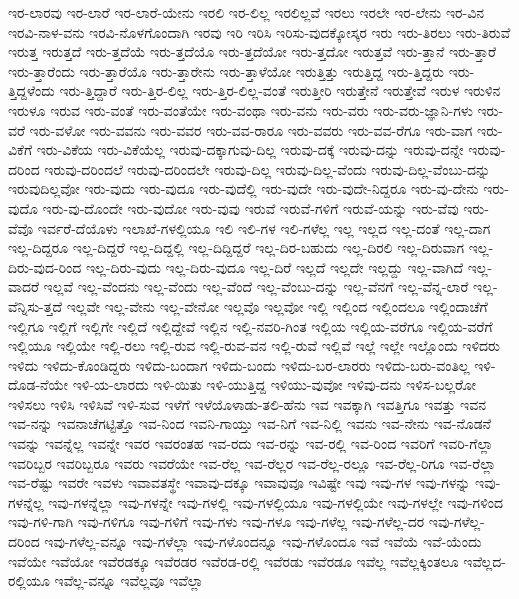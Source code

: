 {ಇರ-ಲಾರವು
ಇರ-ಲಾರೆ
ಇರ-ಲಾರೆ-ಯೇನು
ಇರಲಿ
ಇರ-ಲಿಲ್ಲ
ಇರಲಿಲ್ಲವೆ
ಇರಲು
ಇರಲೇ
ಇರ-ಲೇನು
ಇರ-ವಿನ
ಇರವಿ-ನಾಳ-ವನು
ಇರವಿ-ನೊಳಗೊಂದಾಗಿ
ಇರವು
ಇರಿ
ಇರಿಸಿ
ಇರಿಸು-ವುದಕ್ಕೋಸ್ಕರ
ಇರು
ಇರು-ತಿರಲು
ಇರು-ತಿರುವೆ
ಇರುತ್ತ
ಇರುತ್ತದೆ
ಇರು-ತ್ತದೆಯೆ
ಇರು-ತ್ತದೆಯೊ
ಇರು-ತ್ತದೆಯೋ
ಇರು-ತ್ತದೋ
ಇರುತ್ತವೆ
ಇರು-ತ್ತಾನೆ
ಇರು-ತ್ತಾರೆ
ಇರು-ತ್ತಾರೆಂದು
ಇರು-ತ್ತಾರೆಯೊ
ಇರು-ತ್ತಾರೇನು
ಇರು-ತ್ತಾಳೆಯೋ
ಇರುತ್ತಿತ್ತು
ಇರುತ್ತಿದ್ದ
ಇರು-ತ್ತಿದ್ದರು
ಇರು-ತ್ತಿದ್ದಳೆಂದು
ಇರು-ತ್ತಿದ್ದಾರೆ
ಇರು-ತ್ತಿರ-ಲಿಲ್ಲ
ಇರು-ತ್ತಿರ-ಲಿಲ್ಲ-ವಂತೆ
ಇರುತ್ತೀರಿ
ಇರುತ್ತೇನೆ
ಇರುತ್ತೇವೆ
ಇರುಳ
ಇರುಳಿನ
ಇರುಳೂ
ಇರುವ
ಇರು-ವಂತೆ
ಇರು-ವಂತೆಯೇ
ಇರು-ವಂಥಾ
ಇರು-ವನು
ಇರು-ವರು
ಇರು-ವರು-ಜ್ಞಾನಿ-ಗಳು
ಇರು-ವರೆ
ಇರು-ವಳೋ
ಇರು-ವವನು
ಇರು-ವವರ
ಇರು-ವವ-ರಾರೂ
ಇರು-ವವರು
ಇರು-ವವ-ರೆಗೂ
ಇರು-ವಾಗ
ಇರು-ವಿಕೆಗೆ
ಇರು-ವಿಕೆಯ
ಇರು-ವಿಕೆಯೆಲ್ಲ
ಇರುವು-ದಕ್ಕಾಗುವು-ದಿಲ್ಲ
ಇರುವು-ದಕ್ಕೆ
ಇರುವು-ದನ್ನು
ಇರುವು-ದನ್ನೇ
ಇರುವು-ದರಿಂದ
ಇರುವು-ದರಿಂದಲೆ
ಇರುವು-ದರಿಂದಲೇ
ಇರುವು-ದಿಲ್ಲ
ಇರುವು-ದಿಲ್ಲ-ವೆಂದು
ಇರುವು-ದಿಲ್ಲ-ವೆಂಬು-ದನ್ನು
ಇರುವುದಿಲ್ಲವೋ
ಇರು-ವುದು
ಇರು-ವುದೂ
ಇರು-ವುದೆಲ್ಲಿ
ಇರು-ವುದೇ
ಇರು-ವುದೇ-ನಿದ್ದರೂ
ಇರು-ವು-ದೇನು
ಇರು-ವುದೊ
ಇರು-ವು-ದೊಂದೇ
ಇರು-ವುದೋ
ಇರು-ವುವು
ಇರುವೆ
ಇರುವೆ-ಗಳಿಗೆ
ಇರುವೆ-ಯನ್ನು
ಇರು-ವೆವು
ಇರು-ವೆವೊ
ಇರ್ವರೆ-ದೆಯೊಳು
ಇಲಾಖೆ-ಗಳಲ್ಲಿಯೂ
ಇಲಿ
ಇಲಿ-ಗಳ
ಇಲಿ-ಗಳೆಲ್ಲ
ಇಲ್ಲ
ಇಲ್ಲದ
ಇಲ್ಲ-ದಂತೆ
ಇಲ್ಲ-ದಾಗ
ಇಲ್ಲ-ದಿದ್ದರೂ
ಇಲ್ಲ-ದಿದ್ದರೆ
ಇಲ್ಲ-ದಿದ್ದಲ್ಲಿ
ಇಲ್ಲ-ದಿದ್ದಿದ್ದರೆ
ಇಲ್ಲ-ದಿರ-ಬಹುದು
ಇಲ್ಲ-ದಿರಲಿ
ಇಲ್ಲ-ದಿರುವಾಗ
ಇಲ್ಲ-ದಿರು-ವುದ-ರಿಂದ
ಇಲ್ಲ-ದಿರು-ವುದು
ಇಲ್ಲ-ದಿರು-ವುದೂ
ಇಲ್ಲ-ದಿರೆ
ಇಲ್ಲದೆ
ಇಲ್ಲದೇ
ಇಲ್ಲದ್ದು
ಇಲ್ಲ-ವಾಗಿದೆ
ಇಲ್ಲ-ವಾದರೆ
ಇಲ್ಲವೆ
ಇಲ್ಲ-ವೆಂದನು
ಇಲ್ಲ-ವೆಂದು
ಇಲ್ಲ-ವೆಂದೆ
ಇಲ್ಲ-ವೆಂಬು-ದನ್ನು
ಇಲ್ಲ-ವೆನಗೆ
ಇಲ್ಲ-ವೆನ್ನ-ಲಾರೆ
ಇಲ್ಲ-ವೆನ್ನಿಸು-ತ್ತದೆ
ಇಲ್ಲವೇ
ಇಲ್ಲ-ವೇನು
ಇಲ್ಲ-ವೇನೋ
ಇಲ್ಲವೊ
ಇಲ್ಲವೋ
ಇಲ್ಲಿ
ಇಲ್ಲಿಂದ
ಇಲ್ಲಿಂದಲೂ
ಇಲ್ಲಿಂದಾಚೆಗೆ
ಇಲ್ಲಿಗೂ
ಇಲ್ಲಿಗೆ
ಇಲ್ಲಿಗೇ
ಇಲ್ಲಿದೆ
ಇಲ್ಲಿದ್ದೇವೆ
ಇಲ್ಲಿನ
ಇಲ್ಲಿ-ನವರಿ-ಗಿಂತ
ಇಲ್ಲಿಯ
ಇಲ್ಲಿಯ-ವರೆಗೂ
ಇಲ್ಲಿಯ-ವರೆಗೆ
ಇಲ್ಲಿಯೂ
ಇಲ್ಲಿಯೇ
ಇಲ್ಲಿ-ರಲು
ಇಲ್ಲಿ-ರುವ
ಇಲ್ಲಿ-ರುವ-ವನ
ಇಲ್ಲಿ-ರುವೆ
ಇಲ್ಲಿವೆ
ಇಲ್ಲೆ
ಇಲ್ಲೇ
ಇಲ್ಲೊಂದು
ಇಳಿದರು
ಇಳಿದು
ಇಳಿದು-ಕೊಂಡಿದ್ದರು
ಇಳಿದು-ಬಂದಾಗ
ಇಳಿದು-ಬಂದು
ಇಳಿದು-ಬರ-ಲಾರರು
ಇಳಿದು-ಬರು-ವಂತಿಲ್ಲ
ಇಳಿ-ದೊಡ-ನೆಯೇ
ಇಳಿ-ಯ-ಲಾರದು
ಇಳಿ-ಯಿತು
ಇಳಿ-ಯುತ್ತಿದ್ದ
ಇಳಿಯು-ವುವೋ
ಇಳಿವು-ದನು
ಇಳಿಸ-ಬಲ್ಲರೋ
ಇಳಿಸಲು
ಇಳಿಸಿ
ಇಳಿಸಿವೆ
ಇಳಿ-ಸುವ
ಇಳೆಗೆ
ಇಳೆಯೊಳಾಡು-ತಲಿ-ಹೆನು
ಇವ
ಇವಕ್ಕಾಗಿ
ಇವತ್ತಿಗೂ
ಇವತ್ತು
ಇವನ
ಇವ-ನನ್ನು
ಇವನಾಚೆಗಟ್ಟಿತ್ತೊ
ಇವ-ನಿಂದ
ಇವನಿ-ಗಾಯ್ತು
ಇವ-ನಿಗೆ
ಇವ-ನಿಲ್ಲಿ
ಇವನು
ಇವ-ನೇನು
ಇವ-ನೊಡನೆ
ಇವನ್ನು
ಇವನ್ನೆಲ್ಲ
ಇವನ್ನೇ
ಇವರ
ಇವರಂತಹ
ಇವ-ರದು
ಇವ-ರನ್ನು
ಇವ-ರಲ್ಲಿ
ಇವ-ರಿಂದ
ಇವರಿಗೆ
ಇವರಿ-ಗೆಲ್ಲಾ
ಇವರಿಬ್ಬರ
ಇವರಿಬ್ಬರೂ
ಇವರು
ಇವರೆಯೇ
ಇವ-ರೆಲ್ಲ
ಇವ-ರೆಲ್ಲರ
ಇವ-ರೆಲ್ಲ-ರಲ್ಲೂ
ಇವ-ರೆಲ್ಲ-ರಿಗೂ
ಇವ-ರೆಲ್ಲಾ
ಇವ-ರೆಷ್ಟು
ಇವರೇ
ಇವಳು
ಇವಾವತಸ್ಥೇ
ಇವಾವು-ದಕ್ಕೂ
ಇವಾವುವೂ
ಇವಿಷ್ಟೇ
ಇವು
ಇವು-ಗಳ
ಇವು-ಗಳನ್ನು
ಇವು-ಗಳನ್ನೆಲ್ಲ
ಇವು-ಗಳನ್ನೆಲ್ಲಾ
ಇವು-ಗಳನ್ನೇ
ಇವು-ಗಳಲ್ಲಿ
ಇವು-ಗಳಲ್ಲಿಯೂ
ಇವು-ಗಳಲ್ಲಿಯೇ
ಇವು-ಗಳಲ್ಲೇ
ಇವು-ಗಳಿಂದ
ಇವು-ಗಳಿ-ಗಾಗಿ
ಇವು-ಗಳಿಗೂ
ಇವು-ಗಳಿಗೆ
ಇವು-ಗಳು
ಇವು-ಗಳೂ
ಇವು-ಗಳೆಲ್ಲ
ಇವು-ಗಳೆಲ್ಲ-ದರ
ಇವು-ಗಳೆಲ್ಲ-ದರಿಂದ
ಇವು-ಗಳೆಲ್ಲ-ವನ್ನೂ
ಇವು-ಗಳೆಲ್ಲಾ
ಇವು-ಗಳೊಂದನ್ನೂ
ಇವು-ಗಳೊಂದೂ
ಇವೆ
ಇವೆಯೆ
ಇವೆ-ಯೆಂದು
ಇವೆಯೇ
ಇವೆಯೋ
ಇವೆರಡಕ್ಕೂ
ಇವೆರಡರ
ಇವೆರಡ-ರಲ್ಲಿ
ಇವೆರಡು
ಇವೆರಡೂ
ಇವೆಲ್ಲ
ಇವೆಲ್ಲಕ್ಕಿಂತಲೂ
ಇವೆಲ್ಲದ-ರಲ್ಲಿಯೂ
ಇವೆಲ್ಲ-ವನ್ನೂ
ಇವೆಲ್ಲವೂ
ಇವೆಲ್ಲಾ
}
